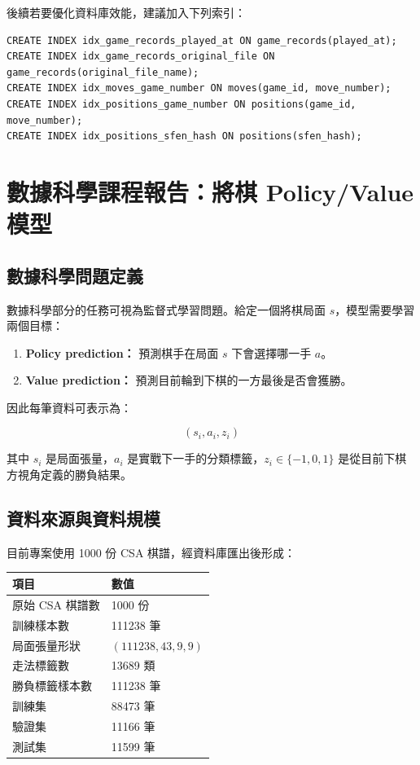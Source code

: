 \documentclass[12pt,a4paper,fontset=none]{ctexart}
\begin{document}
後續若要優化資料庫效能，建議加入下列索引：

\begin{lstlisting}[style=cmd]
CREATE INDEX idx_game_records_played_at ON game_records(played_at);
CREATE INDEX idx_game_records_original_file ON game_records(original_file_name);
CREATE INDEX idx_moves_game_number ON moves(game_id, move_number);
CREATE INDEX idx_positions_game_number ON positions(game_id, move_number);
CREATE INDEX idx_positions_sfen_hash ON positions(sfen_hash);
\end{lstlisting}

\newpage
\section{數據科學課程報告：將棋 Policy/Value 模型}

\subsection{數據科學問題定義}
數據科學部分的任務可視為監督式學習問題。給定一個將棋局面 $s$，模型需要學習兩個目標：

\begin{enumerate}
  \item \textbf{Policy prediction：} 預測棋手在局面 $s$ 下會選擇哪一手 $a$。
  \item \textbf{Value prediction：} 預測目前輪到下棋的一方最後是否會獲勝。
\end{enumerate}

因此每筆資料可表示為：

\[
(s_i, a_i, z_i)
\]

其中 $s_i$ 是局面張量，$a_i$ 是實戰下一手的分類標籤，$z_i \in \{-1,0,1\}$ 是從目前下棋方視角定義的勝負結果。

\subsection{資料來源與資料規模}
目前專案使用 1000 份 CSA 棋譜，經資料庫匯出後形成：

\begin{longtable}{p{}p{}}
\toprule
\textbf{項目} & \textbf{數值}\\
\midrule
\endhead
原始 CSA 棋譜數 & 1000 份\\
訓練樣本數 & 111238 筆\\
局面張量形狀 & $(111238, 43, 9, 9)$\\
走法標籤數 & 13689 類\\
勝負標籤樣本數 & 111238 筆\\
訓練集 & 88473 筆\\
驗證集 & 11166 筆\\
測試集 & 11599 筆\\
\bottomrule
\end{longtable}
\end{document}
